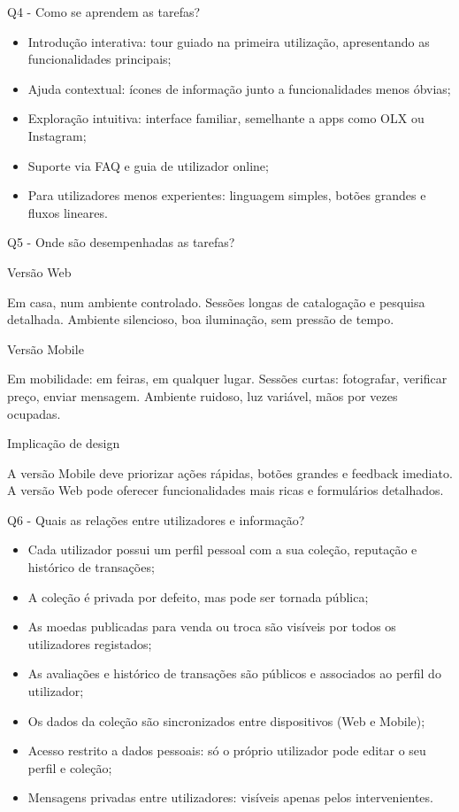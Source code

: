 \documentclass[12pt,a4paper]{article}
\begin{document}
Q4 - Como se aprendem as tarefas?

\begin{itemize}
\setlength{\itemsep}{0.15em}
\item Introdução interativa: tour guiado na primeira utilização, apresentando as funcionalidades principais;
\item Ajuda contextual: ícones de informação junto a funcionalidades menos óbvias;
\item Exploração intuitiva: interface familiar, semelhante a apps como OLX ou Instagram;
\item Suporte via FAQ e guia de utilizador online;
\item Para utilizadores menos experientes: linguagem simples, botões grandes e fluxos lineares.
\end{itemize}

Q5 - Onde são desempenhadas as tarefas?

Versão Web

Em casa, num ambiente controlado. Sessões longas de catalogação e pesquisa detalhada. Ambiente silencioso, boa iluminação, sem pressão de tempo.

Versão Mobile

Em mobilidade: em feiras, em qualquer lugar. Sessões curtas: fotografar, verificar preço, enviar mensagem. Ambiente ruidoso, luz variável, mãos por vezes ocupadas.

Implicação de design

A versão Mobile deve priorizar ações rápidas, botões grandes e feedback imediato. A versão Web pode oferecer funcionalidades mais ricas e formulários detalhados.

Q6 - Quais as relações entre utilizadores e informação?

\begin{itemize}
\setlength{\itemsep}{0.15em}
\item Cada utilizador possui um perfil pessoal com a sua coleção, reputação e histórico de transações;
\item A coleção é privada por defeito, mas pode ser tornada pública;
\item As moedas publicadas para venda ou troca são visíveis por todos os utilizadores registados;
\item As avaliações e histórico de transações são públicos e associados ao perfil do utilizador;
\item Os dados da coleção são sincronizados entre dispositivos (Web e Mobile);
\item Acesso restrito a dados pessoais: só o próprio utilizador pode editar o seu perfil e coleção;
\item Mensagens privadas entre utilizadores: visíveis apenas pelos intervenientes.
\end{itemize}
\end{document}
